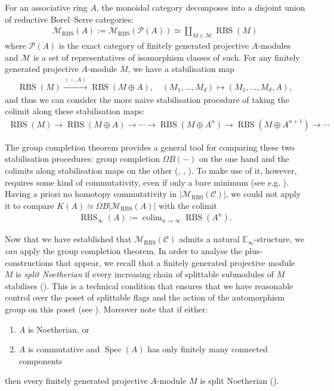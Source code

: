 \documentclass[12pt, reqno]{amsart}
\theoremstyle{plain}
\theoremstyle{definition}
\begin{document}
For an associative ring $A$, the monoidal category decomposes into a disjoint union of reductive Borel--Serre categories:
\begin{align*}
\mathscr{M}_{\operatorname{RBS}}(A):=\mathscr{M}_{\operatorname{RBS}}(\mathcal{P}(A))\simeq \coprod_{M\in \mathcal{M}}\operatorname{RBS}(M)
\end{align*}
where $\mathcal{P}(A)$ is the exact category of finitely generated projective $A$-modules and $\mathcal{M}$ is a set of representatives of isomorphism classes of such. For any finitely generated projective $A$-module $M$, we have a stabilisation map
\begin{align*}
\operatorname{RBS}(M)\xrightarrow{\, (-,A)\, } \operatorname{RBS}(M\oplus A), \quad (M_1,\ldots,M_d)\mapsto (M_1,\ldots,M_d,A),
\end{align*}
and thus we can consider the more naive stabilisation procedure of taking the colimit along these stabilisation maps:
\begin{align*}
\operatorname{RBS}(M)\rightarrow \operatorname{RBS}(M\oplus A)\rightarrow \cdots \rightarrow  \operatorname{RBS}(M\oplus A^n) \rightarrow \operatorname{RBS}(M\oplus A^{n+1})\rightarrow \cdots
\end{align*}

The group completion theorem provides a general tool for comparing these two stabilisation procedures: group completion $\Omega B (-)$ on the one hand and the colimits along stabilisation maps on the other (\cite{McDuffSegal}, \cite{RandalWilliams}, \cite{Nikolaus}). To make use of it, however, requires some kind of commutativity, even if only a bare minimum (see e.g. \cite{Gritschacher}). Having a priori no homotopy commutativity in $|\mathscr{M}_{\operatorname{RBS}}(\mathcal{C})|$, we could not apply it to compare $K(A)\simeq \Omega B| \mathscr{M}_{\operatorname{RBS}}(A)|$ with the colimit
\begin{align*}
\operatorname{RBS}_\infty(A):=\mathop{\operatorname{colim}}_{n\rightarrow \infty}\operatorname{RBS}(A^n).
\end{align*}

Now that we have established that $\mathscr{M}_{\operatorname{RBS}}(\mathcal{C})$ admits a natural $\mathbb{E}_\infty$-structure, we \textit{can} apply the group completion theorem. In order to analyse the plus-constructions that appear, we recall that a finitely generated projective module $M$ is \textit{split Noetherian} if every increasing chain of splittable submodules of $M$ stabilises (\cite[Definition 1.1]{ClausenOrsnesJansen}). This is a technical condition that ensures that we have reasonable control over the poset of splittable flags and the action of the automorphism group on this poset (see \cite[Lemma 5.4]{ClausenOrsnesJansen}). Moreover note that if either:
\begin{enumerate}
\item $A$ is Noetherian, or
\item $A$ is commutative and $\operatorname{Spec}(A)$ has only finitely many connected components
\end{enumerate}
then every finitely generated projective $A$-module $M$ is split Noetherian (\cite[Lemma 5.5]{ClausenOrsnesJansen}).
\end{document}
